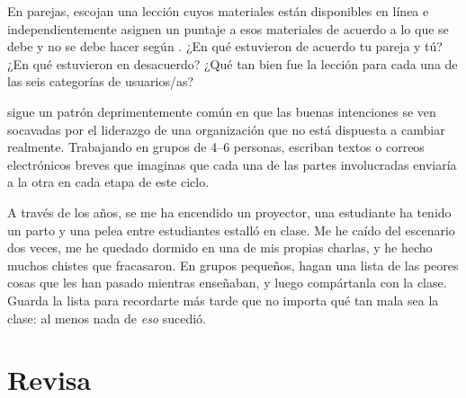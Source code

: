 
En parejas,
escojan una lección cuyos materiales están disponibles en línea
e independientemente asignen un puntaje a esos materiales de acuerdo a lo que se debe y no se debe hacer según
.
¿En qué estuvieron de acuerdo tu pareja y tú?
¿En qué estuvieron en desacuerdo?
¿Qué tan bien fue la lección para cada una de las seis categorías de usuarios/as?


\cite{Coco2018} sigue un patrón deprimentemente común
en que las buenas intenciones se ven socavadas por
el liderazgo de una organización que no está dispuesta a cambiar realmente.
Trabajando en grupos de 4--6 personas,
escriban textos o correos electrónicos breves que imaginas que cada una de las partes involucradas enviaría a la otra
en cada etapa de este ciclo.


A través de los años,
se me ha encendido un proyector,
una estudiante ha tenido un parto
y una pelea entre estudiantes estalló en clase.
Me he caído del escenario dos veces,
me he quedado dormido en una de mis propias charlas,
y he hecho muchos chistes que fracasaron.
En grupos pequeños,
hagan una lista de las peores cosas que les han pasado mientras enseñaban,
y luego compártanla con la clase.
Guarda la lista para recordarte más tarde que no importa qué tan mala sea la clase:
al menos nada de \emph{eso} sucedió.

\section*{Revisa}


